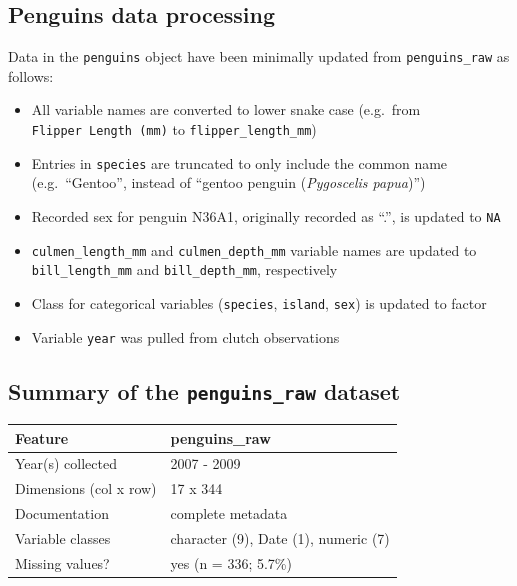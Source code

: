 \hypertarget{penguins-data-processing}{%
\subsection{Penguins data processing}\label{penguins-data-processing}}

Data in the \texttt{penguins} object have been minimally updated from
\texttt{penguins\_raw} as follows:

\begin{itemize}
\tightlist
\item
  All variable names are converted to lower snake case (e.g.~from
  \texttt{Flipper\ Length\ (mm)} to \texttt{flipper\_length\_mm})
\item
  Entries in \texttt{species} are truncated to only include the common
  name (e.g.~``Gentoo'', instead of ``gentoo penguin (\emph{Pygoscelis
  papua})'')
\item
  Recorded sex for penguin N36A1, originally recorded as ``.'', is
  updated to \texttt{NA}
\item
  \texttt{culmen\_length\_mm} and \texttt{culmen\_depth\_mm} variable
  names are updated to \texttt{bill\_length\_mm} and
  \texttt{bill\_depth\_mm}, respectively
\item
  Class for categorical variables (\texttt{species}, \texttt{island},
  \texttt{sex}) is updated to factor
\item
  Variable \texttt{year} was pulled from clutch observations
\end{itemize}

\hypertarget{summary-of-the-penguins_raw-dataset}{%
\subsection{\texorpdfstring{Summary of the \texttt{penguins\_raw}
dataset}{Summary of the penguins\_raw dataset}}\label{summary-of-the-penguins_raw-dataset}}

\begin{Schunk}

\begin{tabular}{ll}
\toprule
Feature & penguins\_raw\\
\midrule
Year(s) collected & 2007 - 2009\\
Dimensions (col x row) & 17 x 344\\
Documentation & complete metadata\\
Variable classes & character (9), Date (1), numeric (7)\\
Missing values? & yes (n = 336; 5.7\%)\\
\bottomrule
\end{tabular}

\end{Schunk}

